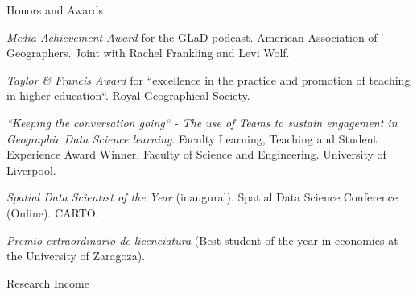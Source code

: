 \documentclass[12pt,2up]{article}
\begin{document}
\begin{cv}{}
\begin{cvlist}{Honors and Awards}
\item[2026] \emph{Media Achievement Award} for the GLaD podcast. American Association of
        Geographers. Joint with Rachel Frankling and Levi Wolf.
\item[2024] \emph{Taylor \& Francis Award} for ``excellence in the practice and
        promotion of teaching in higher education``. Royal Geographical Society.
\item[2021] \emph{``Keeping the conversation going`` - The use of Teams
        to sustain engagement in Geographic Data Science learning}. Faculty
        Learning, Teaching and Student Experience Award Winner. Faculty of
        Science and Engineering. University of Liverpool.
\item[2020] \emph{Spatial Data Scientist of the Year} (inaugural). Spatial Data Science
        Conference (Online). CARTO.
\item[2006] \emph{Premio extraordinario de licenciatura} (Best student of the
    year in economics at the University of Zaragoza).

  \end{cvlist}

 \begin{cvlist}{Research Income}


\end{cvlist}
\end{cv}
\end{document}
